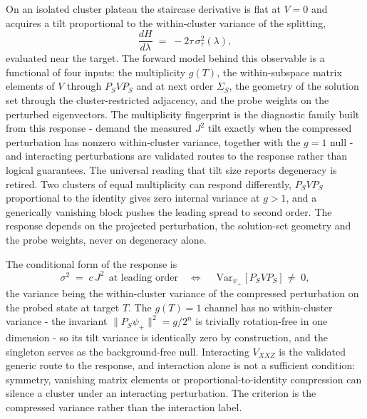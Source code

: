 On an isolated cluster plateau the staircase derivative is flat at $V = 0$ and acquires a tilt proportional to the within-cluster variance of the splitting,
\begin{equation}\label{def:plateau-tilt}
\frac{dH}{d\lambda} \;=\; -2\tau\, \sigma_\tau^2(\lambda),
\end{equation}
evaluated near the target. The forward model behind this observable is a functional of four inputs: the multiplicity $g(T)$, the within-subspace matrix elements of $V$ through $P_S V P_S$ and at next order $\Sigma_S$, the geometry of the solution set through the cluster-restricted adjacency, and the probe weights on the perturbed eigenvectors. The multiplicity fingerprint is the diagnostic family built from this response - demand the measured $J^2$ tilt exactly when the compressed perturbation has nonzero within-cluster variance, together with the $g = 1$ null - and interacting perturbations are validated routes to the response rather than logical guarantees. The universal reading that tilt size reports degeneracy is retired. Two clusters of equal multiplicity can respond differently, $P_S V P_S$ proportional to the identity gives zero internal variance at $g > 1$, and a generically vanishing block pushes the leading spread to second order. The response depends on the projected perturbation, the solution-set geometry and the probe weights, never on degeneracy alone.

The conditional form of the response is
\begin{equation}\label{thm:conditional-visibility-lift}
\sigma^2 \;=\; c\, J^2 \ \ \text{at leading order} \quad\Longleftrightarrow\quad \operatorname{Var}_{\psi_+}\!\bigl[\, P_S V P_S \,\bigr] \;\neq\; 0,
\end{equation}
the variance being the within-cluster variance of the compressed perturbation on the probed state at target $T$. The $g(T) = 1$ channel has no within-cluster variance - the invariant $\|P_S \psi_+\|^2 = g/2^n$ is trivially rotation-free in one dimension - so its tilt variance is identically zero by construction, and the singleton serves as the background-free null. Interacting $V_{XXZ}$ is the validated generic route to the response, and interaction alone is not a sufficient condition: symmetry, vanishing matrix elements or proportional-to-identity compression can silence a cluster under an interacting perturbation. The criterion is the compressed variance rather than the interaction label.

